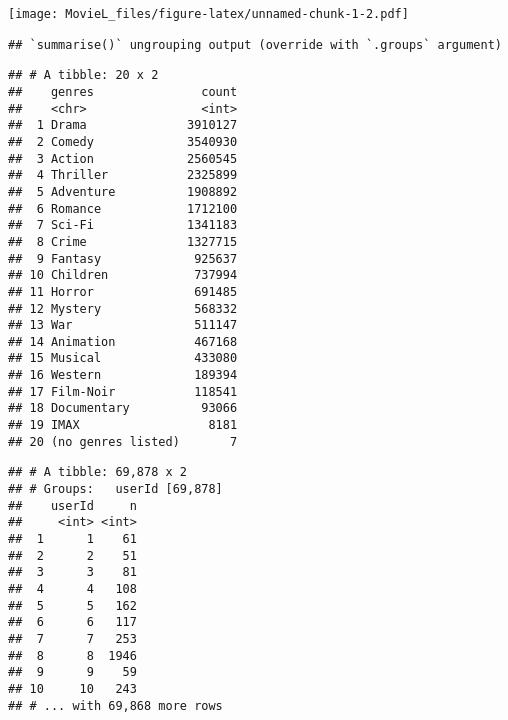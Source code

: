 \documentclass[
]{article}
\newenvironment{Shaded}{\begin{snugshade}}{\end{snugshade}}
\newcommand{\CommentTok}[1]{\textcolor[rgb]{0.56,0.35,0.01}{\textit{#1}}}
\newcommand{\DataTypeTok}[1]{\textcolor[rgb]{0.13,0.29,0.53}{#1}}
\newcommand{\KeywordTok}[1]{\textcolor[rgb]{0.13,0.29,0.53}{\textbf{#1}}}
\newcommand{\NormalTok}[1]{#1}
\newcommand{\OperatorTok}[1]{\textcolor[rgb]{0.81,0.36,0.00}{\textbf{#1}}}
\newcommand{\StringTok}[1]{\textcolor[rgb]{0.31,0.60,0.02}{#1}}
\begin{document}
\texttt{[image: MovieL\_files/figure-latex/unnamed-chunk-1-2.pdf]}

\begin{Shaded}
\end{Shaded}

\begin{verbatim}
## `summarise()` ungrouping output (override with `.groups` argument)
\end{verbatim}

\begin{verbatim}
## # A tibble: 20 x 2
##    genres               count
##    <chr>                <int>
##  1 Drama              3910127
##  2 Comedy             3540930
##  3 Action             2560545
##  4 Thriller           2325899
##  5 Adventure          1908892
##  6 Romance            1712100
##  7 Sci-Fi             1341183
##  8 Crime              1327715
##  9 Fantasy             925637
## 10 Children            737994
## 11 Horror              691485
## 12 Mystery             568332
## 13 War                 511147
## 14 Animation           467168
## 15 Musical             433080
## 16 Western             189394
## 17 Film-Noir           118541
## 18 Documentary          93066
## 19 IMAX                  8181
## 20 (no genres listed)       7
\end{verbatim}

\begin{Shaded}
\end{Shaded}

\begin{verbatim}
## # A tibble: 69,878 x 2
## # Groups:   userId [69,878]
##    userId     n
##     <int> <int>
##  1      1    61
##  2      2    51
##  3      3    81
##  4      4   108
##  5      5   162
##  6      6   117
##  7      7   253
##  8      8  1946
##  9      9    59
## 10     10   243
## # ... with 69,868 more rows
\end{verbatim}
\end{document}
